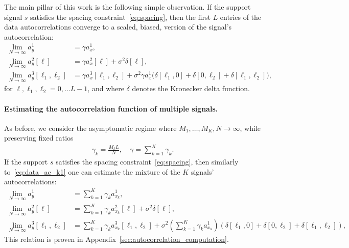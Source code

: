\documentclass[english,11pt]{article}
\newcommand{\1}{\mathbf{1}}
\numberwithin{equation}{section}
\theoremstyle{plain}
\theoremstyle{definition}
\theoremstyle{remark}
\theoremstyle{plain}
\theoremstyle{remark}
\theoremstyle{plain}
\theoremstyle{plain}
\begin{document}
The main pillar of this work is the following simple observation.
If the support signal $s$ satisfies the spacing constraint~\eqref{eq:spacing}, then the first $L$ entries of the data autocorrelations converge 
to a scaled, biased, version of the signal's autocorrelation:
\begin{align} 
\lim_{N\to\infty} a_y^1 & = \gamma a_{x}^1, \nonumber\\
\lim_{N\to\infty} a_y^2[\ell] & = \gamma a_{x}^2[\ell] +\sigma^2\delta[\ell], \label{eq:data_ac_k1} \\
\lim_{N\to\infty} a_y^3[\ell_1,\ell_2] & = \gamma a_{x}^3[\ell_1,\ell_2] + \sigma^2\gamma a_{x}^1 \big(\delta[\ell_1,0]+\delta[0,\ell_2]+\delta[\ell_1,\ell_2]\big), \nonumber
\end{align}
for $\ell,\ell_1,\ell_2=0,\ldots L-1$, and where $\delta$ denotes the Kronecker delta function. 

\paragraph{Estimating the autocorrelation function of multiple signals.}

As before, we consider  the asymptomatic regime where $M_1,\ldots,M_K,N\to\infty$, while preserving fixed ratios
\begin{align}
	\gamma_k = \frac{M_k L}{N}, \quad \gamma = \sum_{k=1}^K\gamma_k.
\end{align}
If the support $s$ satisfies the spacing constraint~\eqref{eq:spacing}, then  similarly to~\eqref{eq:data_ac_k1} one can estimate the mixture of the $K$ signals'  autocorrelations:
\begin{align}
\lim_{N\to\infty} a_y^1 & = \sum_{k=1}^K\gamma_k a_{x_k}^1, \nonumber\\
\lim_{N\to\infty} a_y^2[\ell] & = \sum_{k=1}^K\gamma_k a_{x_k}^2[\ell] +\sigma^2\delta[\ell],  \label{eq:data_ac}\\
\lim_{N\to\infty} a_y^3[\ell_1,\ell_2] & = \sum_{k=1}^K\gamma_k a_{x_k}^3[\ell_1,\ell_2] + \sigma^2\left(\sum_{k=1}^K\gamma_k a_{x_k}^1\right)(\delta[\ell_1,0]+\delta[0,\ell_2]+\delta[\ell_1,\ell_2]), \nonumber
\end{align}
This relation is proven in  Appendix~\ref{sec:autocorrelation_computation}.
\end{document}
